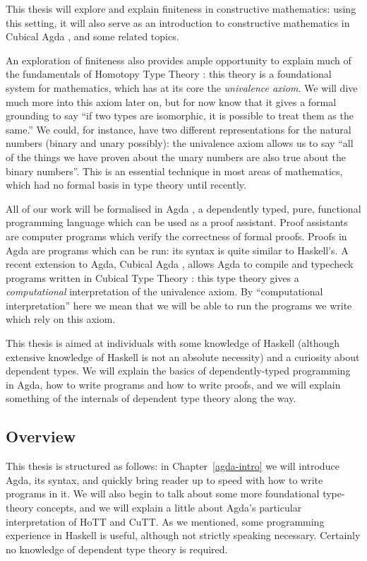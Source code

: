 This thesis will explore and explain finiteness in constructive
mathematics: using this setting, it will also serve as an introduction to
constructive mathematics in Cubical Agda
\citep{vezzosiCubicalAgdaDependently2019}, and some related topics.

An exploration of finiteness also provides ample opportunity to explain much of
the fundamentals of Homotopy Type Theory \citep{hottbook}: this theory is a
foundational system for mathematics, which has at its core the \emph{univalence
  axiom}.
We will dive much more into this axiom later on, but for now know that it gives
a formal grounding to say ``if two types are isomorphic, it is possible to treat
them as the same.''
We could, for instance, have two different representations for the natural
numbers (binary and unary possibly): the univalence axiom allows us to say ``all
of the things we have proven about the unary numbers are also true about the
binary numbers''.
This is an essential technique in most areas of mathematics, which
had no formal basis in type theory until recently.

All of our work will be formalised in Agda
\citep{norellDependentlyTypedProgramming2008}, a
dependently typed, pure, functional programming language which can be
used as a proof assistant.
Proof assistants are computer programs which verify the correctness of formal
proofs.
Proofs in Agda are programs which can be run: its syntax is quite similar to
Haskell's.
A recent extension to Agda, Cubical Agda
\citep{vezzosiCubicalAgdaDependently2019}, allows Agda to compile and typecheck
programs written in Cubical Type Theory \citep{cohenCubicalTypeTheory2016}: this
type theory gives a \emph{computational} interpretation of the univalence axiom.
By ``computational interpretation'' here we mean that we will be able to run the
programs we write which rely on this axiom.

This thesis is aimed at individuals with some knowledge of Haskell (although
extensive knowledge of Haskell is not an absolute necessity) and a curiosity
about dependent types.
We will explain the basics of dependently-typed programming in Agda, how to
write programs and how to write proofs, and we will explain something of the
internals of dependent type theory along the way.
\subsection{Overview}
This thesis is structured as follows: in Chapter~\ref{agda-intro} we will
introduce Agda, its syntax, and quickly bring reader up to speed with how to
write programs in it.
We will also begin to talk about some more foundational type-theory concepts,
and we will explain a little about Agda's particular interpretation of HoTT and
CuTT.
As we mentioned, some programming experience in Haskell is useful, although not
strictly speaking necessary.
Certainly no knowledge of dependent type theory is required.


